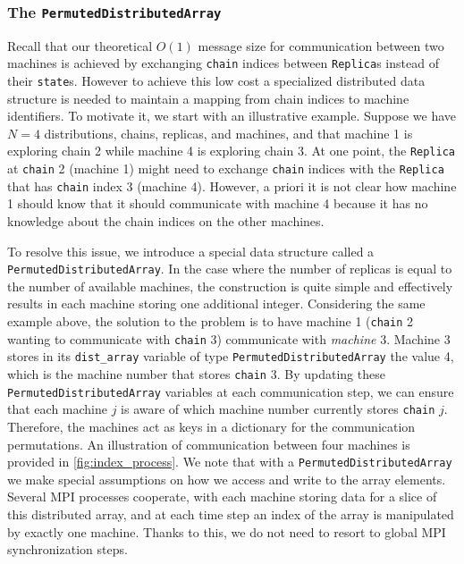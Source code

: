 \subsubsection{The \texttt{PermutedDistributedArray}}
\label{sec:permuted_dist_array}
Recall that our theoretical $O(1)$ message size for communication between two machines 
is achieved by exchanging \texttt{chain} indices between \texttt{Replica}s 
instead of their \texttt{state}s. 
However to achieve this low cost a specialized distributed data structure is 
needed to maintain a mapping from chain indices to machine identifiers. 
To motivate it, we start with an illustrative example. 
Suppose we have $N=4$ distributions, chains, replicas, and machines, and that 
machine 1 is exploring chain 2 while machine 4 is exploring chain 3.
At one point, the \texttt{Replica} at \texttt{chain} 2 (machine 1) might need to exchange
\texttt{chain} indices with the \texttt{Replica} that has \texttt{chain} index 3 (machine 4). 
However, a priori it is not clear how machine 1 should know that it should communicate 
with machine 4 because it has no knowledge about the chain indices on the other machines.

\medskip 
To resolve this issue, we introduce a special data structure called a 
\texttt{PermutedDistributedArray}. In the case where the number of replicas is 
equal to the number of available machines, the construction is quite simple
and effectively results in each machine storing one additional integer. 
Considering the same example above, the solution to the problem is to have
machine 1 (\texttt{chain} 2 wanting to communicate with \texttt{chain} 3) 
communicate with \textit{machine} 3. 
Machine 3 stores in its \texttt{dist\_array} variable of type 
\texttt{PermutedDistributedArray} the value 4, which is the machine number that 
stores \texttt{chain} 3. By updating these \texttt{PermutedDistributedArray} 
variables at each communication step, we can ensure that each machine $j$ is aware 
of which machine number currently stores \texttt{chain} $j$. 
Therefore, the machines act as keys in a dictionary for the communication 
permutations.
An illustration of communication between four machines is provided in 
\cref{fig:index_process}.
We note that with a \texttt{PermutedDistributedArray} we make special assumptions 
on how we access and write to the array elements. 
Several MPI processes cooperate, with each machine storing 
data for a slice of this distributed array, and at each time 
step an index of the array is manipulated by exactly one machine. 
Thanks to this, we do not need to resort to global MPI synchronization steps. 

